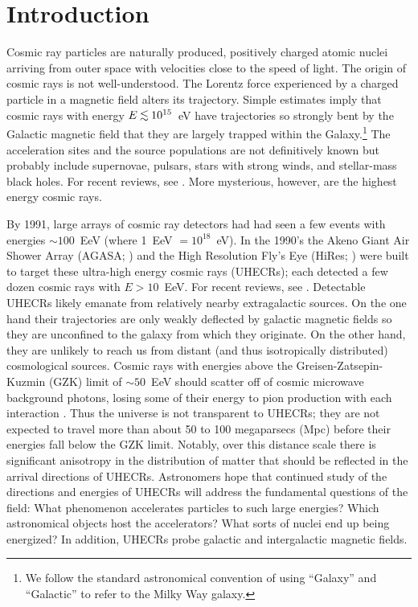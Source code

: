 \section{Introduction}

Cosmic ray particles are naturally produced, positively charged atomic nuclei
arriving from outer space with velocities close to the speed of light.  
The origin of cosmic rays is not well-understood. The Lorentz force
experienced by a charged particle in a magnetic field alters its trajectory.
Simple estimates imply that cosmic rays with energy $E \lta 10^{15}$~eV 
have trajectories so strongly bent
by the Galactic magnetic field that they are largely trapped within the
Galaxy.\footnote{We follow the standard astronomical convention of using
``Galaxy'' and ``Galactic'' to refer to the Milky Way galaxy.}  The
acceleration sites and the source populations are not definitively known but
probably include supernovae, pulsars, stars with strong winds, and
stellar-mass black holes. For recent reviews, see \cite{Cronin99,Hillas06}.
More mysterious, however, are the highest energy
cosmic rays.

By 1991, large arrays of cosmic ray detectors had had seen a few events with
energies $\sim 100$~EeV (where 1~EeV $=10^{18}$~eV). In the 1990's the Akeno
Giant Air Shower Array (AGASA; \cite{1992APh.....1...27C}) and the High
Resolution Fly's Eye (HiRes; \cite{2002NIMPA.482..457B}) were built to
target these ultra-high energy cosmic rays (UHECRs); each detected a few
dozen cosmic rays with $E>10$~EeV.  For recent reviews, see
\cite{KO11-UHECRs,LS11-UHECRs}.
Detectable UHECRs likely emanate from relatively nearby extragalactic
sources. On the one hand their trajectories are only weakly deflected by
galactic magnetic fields so they are unconfined to the galaxy from which
they originate.  On the other hand, they are unlikely to reach us from
distant (and thus isotropically distributed) cosmological sources.  Cosmic
rays with energies above the Greisen-Zatsepin-Kuzmin (GZK) limit of $\sim
50$~EeV  should scatter off of cosmic microwave background photons, losing
some of their energy to pion production with each interaction
\cite{G66-GZK,ZK66-GZK}.  Thus the universe is not transparent to UHECRs;
they are not expected to travel more than about 50 to 100 megaparsecs (Mpc)
before their energies fall below the GZK limit. Notably, over this distance
scale there is significant anisotropy in the distribution of matter that
should be reflected in the arrival directions of UHECRs. Astronomers hope
that continued study of the directions and energies of UHECRs will address
the fundamental questions of the field: What phenomenon accelerates
particles to such large energies?  Which astronomical objects host the
accelerators?  What sorts of nuclei end up being energized?  In addition,
UHECRs probe galactic and intergalactic magnetic fields.

